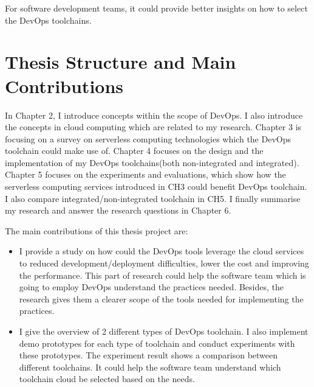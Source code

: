 For software development teams, it could provide better insights on how to select the DevOps toolchains.
\section{Thesis Structure and Main Contributions}
In Chapter 2, I introduce concepts within the scope of DevOps. I also introduce the concepts in cloud computing which are related to my research. Chapter 3 is focusing on a survey on serverless computing technologies which the DevOps toolchain could make use of. Chapter 4 focuses on the design and the implementation of my DevOps toolchains(both non-integrated and integrated). Chapter 5 focuses on the experiments and evaluations, which show how the serverless computing services introduced in CH3 could benefit DevOps toolchain. I also compare integrated/non-integrated toolchain in CH5. I finally summarise my research and answer the research questions in Chapter 6.
\par
The main contributions of this thesis project are:
\begin{itemize}
    \item I provide a study on how could the DevOps tools leverage the cloud services to reduced development/deployment difficulties, lower the cost and improving the performance. This part of research could help the software team which is going to employ DevOps understand the practices needed. Besides, the research gives them a clearer scope of the tools needed for implementing the practices.
    \item I give the overview of 2 different types of DevOps toolchain. I also implement demo prototypes for each type of toolchain and conduct experiments with these prototypes. The experiment result shows a comparison between different toolchains. It could help the software team understand which toolchain cloud be selected based on the needs.
\end{itemize}